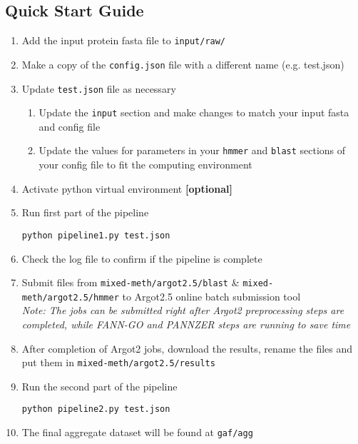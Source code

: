 \subsection{Quick Start Guide}

\begin{enumerate}
    \item Add the input protein fasta file to \texttt{input/raw/}
    \item Make a copy of the \texttt{config.json} file with a different name (e.g. test.json)
    \item Update \texttt{test.json} file as necessary
    \begin{enumerate}
        \item Update the \texttt{input} section and make changes to match your input fasta and config file
        \item Update the values for parameters in your \texttt{hmmer} and \texttt{blast} sections of your config file to fit the computing environment
    \end{enumerate}
    \item Activate python virtual environment \textbf{[optional]}
    \item Run first part of the pipeline
    \begin{verbatim}
python pipeline1.py test.json
    \end{verbatim}
    \item Check the log file to confirm if the pipeline is complete
    \item Submit files from \texttt{mixed-meth/argot2.5/blast} \& \texttt{mixed-meth/argot2.5/hmmer} to Argot2.5 online batch submission tool \\
    \emph{Note: The jobs can be submitted right after Argot2 preprocessing steps are completed, while FANN-GO and PANNZER steps are running to save time}
    \item After completion of Argot2 jobs, download the results, rename the files and put them in \texttt {mixed-meth/argot2.5/results}
    \item Run the second part of the pipeline
    \begin{verbatim}
python pipeline2.py test.json
    \end{verbatim}
    \item The final aggregate dataset will be found at \texttt{gaf/agg}
\end{enumerate}